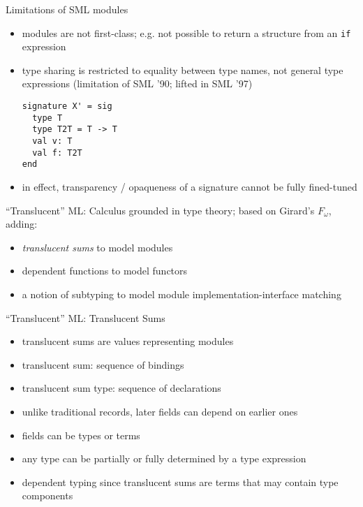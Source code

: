 \documentclass{beamer}
\begin{document}
\begin{frame}[fragile]{Limitations of SML modules}
\begin{itemize}
\item modules are not first-class; e.g. not possible to return a
  structure from an {\tt if} expression
\item type sharing is restricted to equality between type names, not
  general type expressions (limitation of SML '90; lifted in SML '97)
\begin{verbatim}
signature X' = sig
  type T
  type T2T = T -> T
  val v: T
  val f: T2T
end
\end{verbatim}
\item in effect, transparency / opaqueness of a signature cannot be
  fully fined-tuned
\end{itemize}
\end{frame}

\begin{frame}{``Translucent'' ML: Calculus}
grounded in type theory; based on Girard's $F_\omega$, adding:
\begin{itemize}
\item {\it translucent sums} to model modules
\item dependent functions to model functors
\item a notion of subtyping to model module implementation-interface matching
\end{itemize}
\end{frame}

\begin{frame}{``Translucent'' ML: Translucent Sums}
\begin{itemize}
\item translucent sums are values representing modules
\item translucent sum: sequence of bindings
\item translucent sum type: sequence of declarations
\item unlike traditional records, later fields can depend on earlier ones
\item fields can be types or terms
\item any type can be partially or fully determined by a type expression
\item dependent typing since translucent sums are terms that may contain type components
\end{itemize}
\end{frame}
\end{document}
